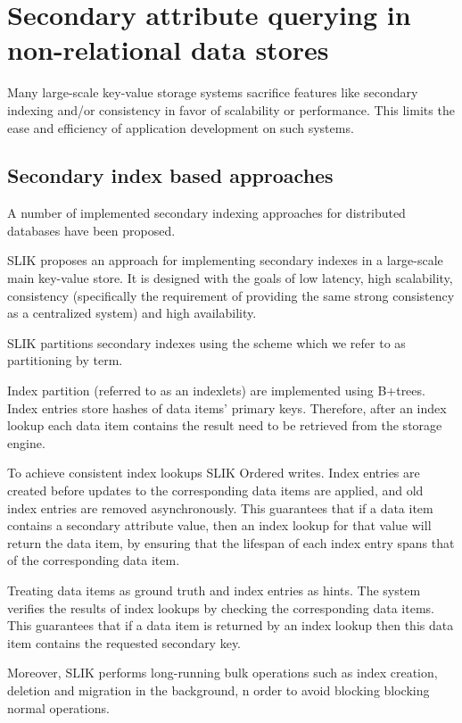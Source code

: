 \section{Secondary attribute querying in non-relational data stores}

Many large-scale key-value storage systems sacrifice features like secondary indexing and/or consistency in favor of scalability or performance. This limits the ease and efficiency of application development on such systems.

\subsection{Secondary index based approaches}
A number of implemented secondary indexing approaches for distributed databases have been proposed.


SLIK \cite{kejriwal:slik} proposes an approach for implementing secondary indexes in a large-scale main key-value store.
It is designed with the goals of low latency, high scalability, consistency
(specifically the requirement of providing the same strong consistency as a centralized system) and high availability.

SLIK partitions secondary indexes using the scheme which we refer to as partitioning by term.

Index partition (referred to as an indexlets) are implemented using B+trees.
Index entries store hashes of data items' primary keys.
Therefore, after an index lookup each data item contains the result need to be retrieved from the storage engine.

To achieve consistent index lookups SLIK
Ordered writes.
Index entries are created before updates to the corresponding data items are applied,
and old index entries are removed asynchronously.
This guarantees that if a data item contains a secondary attribute value, then an index lookup for that value will return the data item,
by ensuring that the lifespan of each index entry spans that of the corresponding data item.

Treating data items as ground truth and index entries as hints.
The system verifies the results of index lookups by checking the corresponding data items.
This guarantees that if a data item is returned by an index lookup then this data item contains the requested secondary key.

Moreover, SLIK performs long-running bulk operations such as index creation, deletion and migration in the background,
n order to avoid blocking blocking normal operations.

